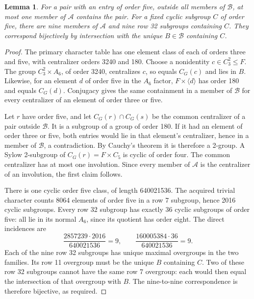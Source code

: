 \documentclass[11pt,a4paper]{article}
\newtheorem{lemma}{Lemma}\newtheorem{theorem}{Theorem}
\begin{document}
\begin{lemma}\label{central}
For a pair with an entry of order five, outside all members of
$\mathcal B$, at most one member of $\mathcal A$ contains the pair.
For a fixed cyclic subgroup $C$ of order five, there are nine
members of $\mathcal A$ and nine row 32 subgroups containing $C$.
They correspond bijectively by intersection with the unique
$B\in\mathcal B$ containing $C$.
\end{lemma}
\begin{proof}
The primary character table has one element class of each of orders
three and five, with centralizer orders 3240 and 180. Choose a
nonidentity $c\in C_3^2\leq F$. The group $C_3^2\times A_6$, of
order 3240, centralizes $c$, so equals $C_G(c)$ and lies in $B$.
Likewise, for an element $d$ of order five in the $A_6$ factor,
$F\times\langle d\rangle$ has order 180 and equals $C_G(d)$.
Conjugacy gives the same containment in a member of $\mathcal B$
for every centralizer of an element of order three or five.

Let $r$ have order five, and let $C_G(r)\cap C_G(s)$ be the common
centralizer of a pair outside $\mathcal B$. It is a subgroup of a
group of order 180. If it had an element of order three or five,
both entries would lie in that element's centralizer, hence in a
member of $\mathcal B$, a contradiction. By Cauchy's theorem it
is therefore a 2-group. A Sylow 2-subgroup of
$C_G(r)=F\times C_5$ is cyclic of order four. The common
centralizer has at most one involution. Since every member of
$\mathcal A$ is the centralizer of an involution, the first claim
follows.

There is one cyclic order five class, of length 640021536. The
acquired trivial character counts 8064 elements of order five in
a row 7 subgroup, hence 2016 cyclic subgroups. Every row 32
subgroup has exactly 36 cyclic subgroups of order five: all lie
in its normal $A_6$, since its quotient has order eight. The direct
incidences are
\[
 \frac{2857239\cdot2016}{640021536}=9,
 \qquad
 \frac{160005384\cdot36}{640021536}=9.
\]
Each of the nine row 32 subgroups has unique maximal overgroups
in the two families. Its row 11 overgroup must be the unique $B$
containing $C$. Two of these row 32 subgroups cannot have the same
row 7 overgroup: each would then equal the intersection of that
overgroup with $B$. The nine-to-nine correspondence is therefore
bijective, as required.
\end{proof}
\end{document}

